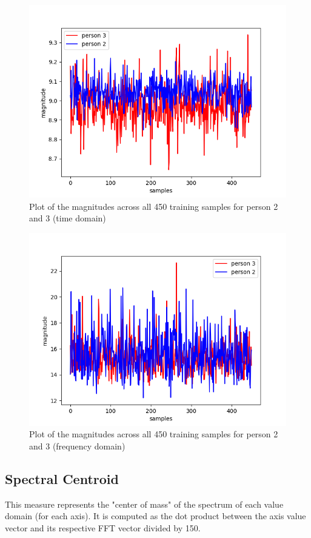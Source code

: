 \documentclass{article}
\begin{document}
\begin{figure}[h]
	\centering
	\includegraphics[scale=0.36]{magnitude46_time_dmn.png}
	\caption{Plot of the magnitudes across all 450 training samples for person 2 and 3 (time domain)}
\end{figure}

\begin{figure}[h]
	\centering
	\includegraphics[scale=0.36]{magnitude46_freq_dmn.png}
	\caption{Plot of the magnitudes across all 450 training samples for person 2 and 3 (frequency domain)}
\end{figure}

\subsection{Spectral Centroid}
This measure represents the "center of mass" of the spectrum of each value domain (for each axis). It is computed as the dot product between the axis value vector and its respective FFT vector divided by 150.
\end{document}
